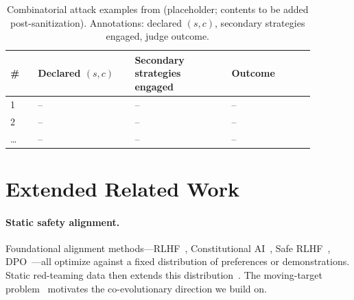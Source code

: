 \begin{table}[h]
  \centering
  \small
  \caption{Combinatorial attack examples from \method (placeholder; contents to be added post-sanitization). Annotations: declared $(s,c)$, secondary strategies engaged, judge outcome.}
  \label{tab:combinatorial}
  \begin{tabular}{p{0.08\linewidth} p{0.28\linewidth} p{0.28\linewidth} p{0.24\linewidth}}
    \toprule
    \textbf{\#} & \textbf{Declared $(s,c)$} & \textbf{Secondary strategies engaged} & \textbf{Outcome} \\
    \midrule
    1 & -- & -- & -- \\
    2 & -- & -- & -- \\
    \ldots & -- & -- & -- \\
    \bottomrule
  \end{tabular}
\end{table}

\section{Extended Related Work}
\label{apdx:related-work-full}

\paragraph{Static safety alignment.} Foundational alignment methods---RLHF~\citep{ouyang2022training}, Constitutional AI~\citep{bai2022constitutional}, Safe RLHF~\citep{dai2023safe}, DPO~\citep{rafailov2023dpo}---all optimize against a fixed distribution of preferences or demonstrations. Static red-teaming data then extends this distribution~\citep{jiang2024wildteaming, mazeika2024harmbench, rottger2023xstest, cui2024orbench, souly2024strongreject, xie2024sorry}. The moving-target problem~\citep{liu2025chasing} motivates the co-evolutionary direction we build on.

